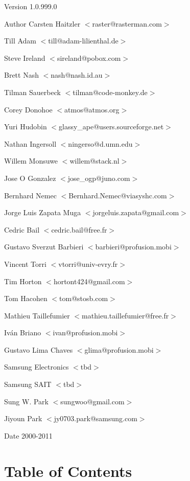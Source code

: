 

\begin{DoxyVersion}{Version}
1.0.999.0 
\end{DoxyVersion}
\begin{DoxyAuthor}{Author}
Carsten Haitzler $<$raster@rasterman.com$>$ 

Till Adam $<$till@adam-\/lilienthal.de$>$ 

Steve Ireland $<$sireland@pobox.com$>$ 

Brett Nash $<$nash@nash.id.au$>$ 

Tilman Sauerbeck $<$tilman@code-\/monkey.de$>$ 

Corey Donohoe $<$atmos@atmos.org$>$ 

Yuri Hudobin $<$glassy\_\-ape@users.sourceforge.net$>$ 

Nathan Ingersoll $<$ningerso@d.umn.edu$>$ 

Willem Monsuwe $<$willem@stack.nl$>$ 

Jose O Gonzalez $<$jose\_\-ogp@juno.com$>$ 

Bernhard Nemec $<$Bernhard.Nemec@viasyshc.com$>$ 

Jorge Luis Zapata Muga $<$jorgeluis.zapata@gmail.com$>$ 

Cedric Bail $<$cedric.bail@free.fr$>$ 

Gustavo Sverzut Barbieri $<$barbieri@profusion.mobi$>$ 

Vincent Torri $<$vtorri@univ-\/evry.fr$>$ 

Tim Horton $<$hortont424@gmail.com$>$ 

Tom Hacohen $<$tom@stosb.com$>$ 

Mathieu Taillefumier $<$mathieu.taillefumier@free.fr$>$ 

Iván Briano $<$ivan@profusion.mobi$>$ 

Gustavo Lima Chaves $<$glima@profusion.mobi$>$ 

Samsung Electronics $<$tbd$>$ 

Samsung SAIT $<$tbd$>$ 

Sung W. Park $<$sungwoo@gmail.com$>$ 

Jiyoun Park $<$jy0703.park@samsung.com$>$ 
\end{DoxyAuthor}
\begin{DoxyDate}{Date}
2000-\/2011
\end{DoxyDate}
\hypertarget{index_toc}{}\section{Table of Contents}\label{index_toc}
